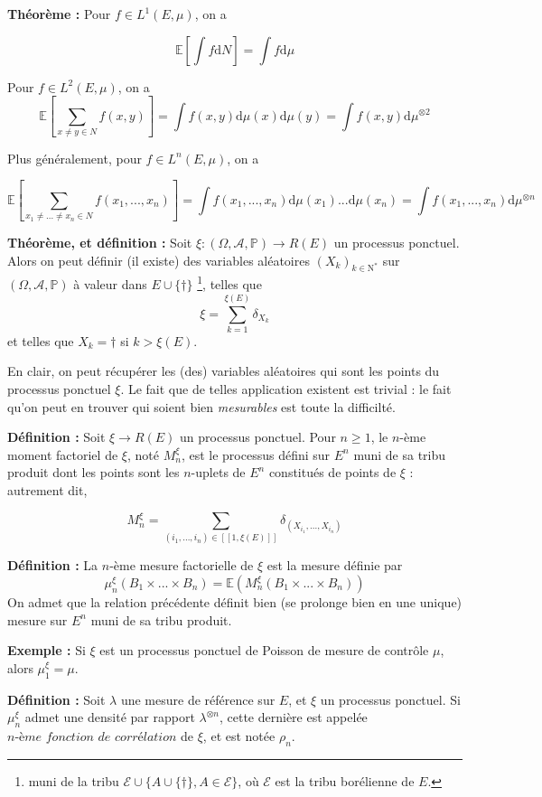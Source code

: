 \documentclass[12pt]{article}
\let\oldsum\sum
\renewcommand{\sum}{\oldsum\limits}
\begin{document}
\textbf{Théorème :} Pour $f \in L^1(E,\mu) $, on a 

$$ \mathbb E \left[ \int f \mathrm d N \right] = \int f \mathrm d \mu $$

Pour $f \in L^2(E,\mu) $, on a $$ \mathbb E \left[ \sum_{x \neq y \in N} f(x,y) \right] = \int f(x,y) \mathrm d \mu(x) \mathrm d\mu(y) = \int f(x,y) \mathrm d \mu^{\otimes 2} $$

Plus généralement, pour $f \in L^n(E,\mu) $, on a 

$$ \mathbb E \left[ \sum_{x_1 \neq ... \neq x_n \in N} f(x_1,...,x_n) \right] = \int f(x_1,...,x_n) \mathrm d \mu(x_1) ... \mathrm d\mu(x_n) = \int f(x_1,...,x_n) \mathrm d \mu^{\otimes n} $$

\textbf{Théorème, et définition :} Soit $ \xi : (\Omega, \mathcal A, \mathbb P) \to R(E)$ un processus ponctuel. Alors on peut définir (il existe) des variables aléatoires $(X_k)_{k \in \mathrm N^*}$ sur $(\Omega, \mathcal A, \mathbb P)$ à valeur dans $ E \cup \{ \dagger\}$ \footnote{muni de la tribu $ \mathcal E \cup \{ A \cup \{ \dagger \}, A \in \mathcal E \} $, où $ \mathcal E $ est la tribu borélienne de $E$.}, telles que $$ \xi = \sum_{k=1}^{\xi(E)} \delta_{X_k} $$ et telles que $ X_k = \dagger $ si $ k > \xi(E) $.

En clair, on peut récupérer les (des) variables aléatoires qui sont les points du processus ponctuel $\xi$. Le fait que de telles application existent est trivial : le fait qu'on peut en trouver qui soient bien \textit{mesurables} est toute la difficilté.

\textbf{Définition :} Soit $ \xi \to R(E)$ un processus ponctuel. Pour $n \geqslant 1$, le $n$-ème moment factoriel de $\xi$, noté $M_n^\xi$, est le processus défini sur $E^n$ muni de sa tribu produit dont les points sont les $n$-uplets de $E^n$ constitués de points de $\xi$ : autrement dit,

$$ M_n^\xi = \sum_{(i_1,...,i_n) \in [\![1,\xi(E)]\!]} \delta_{(X_{i_1},...,X_{i_n})}$$

\textbf{Définition :} La $n$-ème mesure factorielle de $ \xi $ est la mesure définie par $$ \mu_n^\xi(B_1 \times ... \times B_n )= \mathbb E( M_n^\xi(B_1\times ... \times B_n)) $$ On admet que la relation précédente définit bien (se prolonge bien en une unique) mesure sur $E^n$ muni de sa tribu produit.

\textbf{Exemple :} Si $\xi$ est un processus ponctuel de Poisson de mesure de contrôle $ \mu $, alors $ \mu_1^\xi = \mu $.

\textbf{Définition :} Soit $ \lambda $ une mesure de référence sur $E$, et $ \xi $ un processus ponctuel. Si $ \mu^\xi_n $ admet une densité par rapport $ \lambda^{\otimes n} $, cette dernière est appelée $\textit{n-ème fonction de corrélation}$ de $\xi$, et est notée $\rho_n$.
\end{document}
